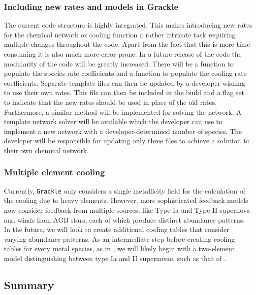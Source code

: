 \subsubsection{Including new rates and models in Grackle}
The current code structure is highly integrated. This makes introducing new rates for the 
chemical network or cooling function a rather intricate task requiring multiple changes throughout the code. 
Apart from the fact that this is more time consuming it is also much more error prone. In a future release of the 
code the modularity of the code will be greatly increased. There will be a function to populate the species 
rate coefficients and a function to populate the cooling rate coefficients. Separate template files can then be 
updated by a developer wishing to use their own rates. This file can then be included in the build and a flag
set to indicate that the new rates should be used in place of the old rates. Furthermore, a similar method will be 
implemented for solving the network. A template network solver will be available which the developer can use to 
implement a new network with a developer-determined number of species. The developer will be responsible for
updating only three files to achieve a solution to their own chemical network. 


\subsubsection{Multiple element cooling}

Currently, \texttt{Grackle} only considers a single metallicity field
for the calculation of the cooling due to heavy elements.  However,
more sophisticated feedback models now consider feedback from multiple
sources, like Type Ia and Type II supernova and winds from AGB stars,
each of which produce distinct abundance patterns.  In the future, we
will look to create additional cooling tables that consider varying
abundance patterns.  As an intermediate step before creating cooling
tables for every metal species, as in \citet{2009MNRAS.393...99W}, we
will likely begin with a two-element model distinguishing between type
Ia and II supernovae, such as that of \citet{2013MNRAS.433.3005D}.

\subsection{Summary}

